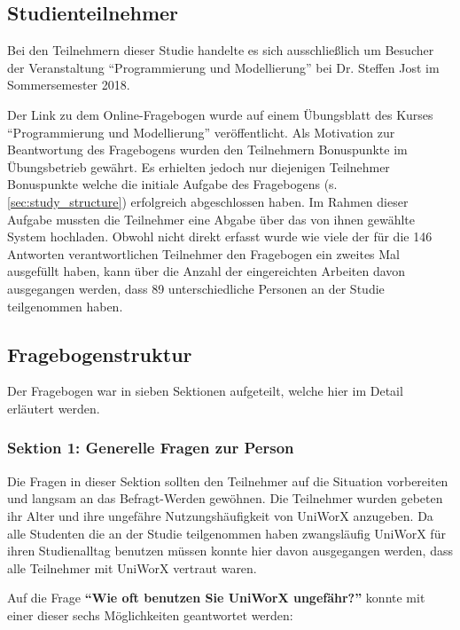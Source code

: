 \documentclass[11pt,a4paper,twoside,ngerman]{article}
\begin{document}
\subsection{Studienteilnehmer} \label{sec:studyparticipants}
Bei den Teilnehmern dieser Studie handelte es sich ausschließlich um Besucher der Veranstaltung "`Programmierung und Modellierung"' bei Dr. Steffen Jost im Sommersemester 2018.

Der Link zu dem Online-Fragebogen wurde auf einem Übungsblatt des Kurses "`Programmierung und Modellierung"' veröffentlicht. Als Motivation zur Beantwortung des Fragebogens wurden den Teilnehmern Bonuspunkte im Übungsbetrieb gewährt. Es erhielten jedoch nur diejenigen Teilnehmer Bonuspunkte welche die initiale Aufgabe des Fragebogens (s. \autoref{sec:study_structure}) erfolgreich abgeschlossen haben. Im Rahmen dieser Aufgabe mussten die Teilnehmer eine Abgabe über das von ihnen gewählte System hochladen. Obwohl nicht direkt erfasst wurde wie viele der für die 146 Antworten verantwortlichen Teilnehmer den Fragebogen ein zweites Mal ausgefüllt haben, kann über die Anzahl der eingereichten Arbeiten davon ausgegangen werden, dass 89 unterschiedliche Personen an der Studie teilgenommen haben.

\subsection{Fragebogenstruktur} \label{sec:study_structure}
Der Fragebogen war in sieben Sektionen aufgeteilt, welche hier im Detail erläutert werden.

\subsubsection{Sektion 1: Generelle Fragen zur Person}
Die Fragen in dieser Sektion sollten den Teilnehmer auf die Situation vorbereiten und langsam an das Befragt-Werden gewöhnen. Die Teilnehmer wurden gebeten ihr Alter und ihre ungefähre Nutzungshäufigkeit von UniWorX anzugeben. Da alle Studenten die an der Studie teilgenommen haben zwangsläufig UniWorX für ihren Studienalltag benutzen müssen konnte hier davon ausgegangen werden, dass alle Teilnehmer mit UniWorX vertraut waren.

Auf die Frage \textbf{"`Wie oft benutzen Sie UniWorX ungefähr?"'} konnte mit einer dieser sechs Möglichkeiten geantwortet werden:
\end{document}
